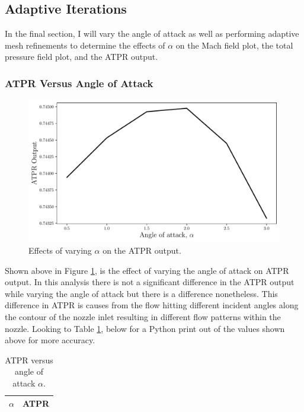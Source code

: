 \pagebreak
\subsection{Adaptive Iterations}

In the final section, I will vary the angle of attack as well as performing adaptive mesh refinements to determine the effects of $\alpha$ on the Mach field plot, the total pressure field plot, and the ATPR output. 

\subsubsection{ATPR Versus Angle of Attack}
\begin{figure}[h]
    \centering
    \includegraphics[width = 0.9\linewidth]{rep/q5/ATPR.pdf}
    \caption[ATPR and Angle of Attack]{Effects of varying $\alpha$ on the ATPR output.}
    \label{fig:aoa_ATPR}
\end{figure}

Shown above in Figure \ref{fig:aoa_ATPR}, is the effect of varying the angle of attack on ATPR output. In this analysis there is not a significant difference in the ATPR output while varying the angle of attack but there is a difference nonetheless. This difference in ATPR is causes from the flow hitting different incident angles along the contour of the nozzle inlet resulting in different flow patterns within the nozzle. Looking to Table \ref{tab:ATPR_alpha}, below for a Python print out of the values shown above for more accuracy.

\begin{table}[h]
    \centering
    \caption[ATPR Versus Angle of Attack]{ATPR versus angle of attack $\alpha$.}
    \label{tab:ATPR_alpha}
    \begin{tabular}{l|l}
        $\alpha$ & ATPR\\ \hline\hline
        
    \end{tabular}
\end{table}

